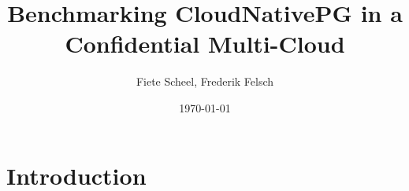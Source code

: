 \documentclass[a4paper, ngerman, 12pt]{scrreprt}
\begin{document}
\title{Benchmarking CloudNativePG in a Confidential Multi-Cloud} %
\author{Fiete Scheel, Frederik Felsch} %
\date{\today} %

\maketitle

\tableofcontents
\newpage

\chapter{Introduction}


\printbibliography


\end{document}
